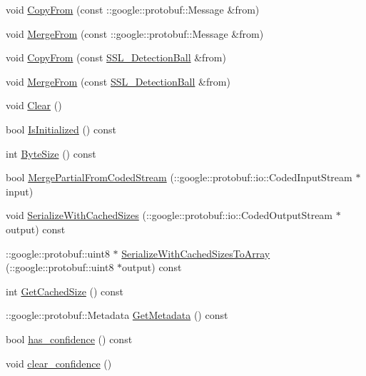 \begin{DoxyCompactItemize}
\item 
void \hyperlink{class_s_s_l___detection_ball_a55771fde572c265105d1bc3a7194a23b}{Copy\-From} (const \-::google\-::protobuf\-::\-Message \&from)
\item 
void \hyperlink{class_s_s_l___detection_ball_a66d69ce3f2f6871e52a61d64d3059867}{Merge\-From} (const \-::google\-::protobuf\-::\-Message \&from)
\item 
void \hyperlink{class_s_s_l___detection_ball_a94709b3e2b567fef87974d769b4bcfbf}{Copy\-From} (const \hyperlink{class_s_s_l___detection_ball}{S\-S\-L\-\_\-\-Detection\-Ball} \&from)
\item 
void \hyperlink{class_s_s_l___detection_ball_acff44da2b0b08d44c6aaf62079c52e38}{Merge\-From} (const \hyperlink{class_s_s_l___detection_ball}{S\-S\-L\-\_\-\-Detection\-Ball} \&from)
\item 
void \hyperlink{class_s_s_l___detection_ball_a681f818c96bf557392a222296015f09f}{Clear} ()
\item 
bool \hyperlink{class_s_s_l___detection_ball_a156f6ba0f59d688dc9c1206e04011b95}{Is\-Initialized} () const 
\item 
int \hyperlink{class_s_s_l___detection_ball_ae17b89fdfbf9d1fb0db1e3f990625e1d}{Byte\-Size} () const 
\item 
bool \hyperlink{class_s_s_l___detection_ball_abed181a7915fec99436b8649d65b4cdc}{Merge\-Partial\-From\-Coded\-Stream} (\-::google\-::protobuf\-::io\-::\-Coded\-Input\-Stream $\ast$input)
\item 
void \hyperlink{class_s_s_l___detection_ball_ad652651f42df1fa26c419d6829690ee5}{Serialize\-With\-Cached\-Sizes} (\-::google\-::protobuf\-::io\-::\-Coded\-Output\-Stream $\ast$output) const 
\item 
\-::google\-::protobuf\-::uint8 $\ast$ \hyperlink{class_s_s_l___detection_ball_a654f5ed1b81a0e8f0be17659f28f97d9}{Serialize\-With\-Cached\-Sizes\-To\-Array} (\-::google\-::protobuf\-::uint8 $\ast$output) const 
\item 
int \hyperlink{class_s_s_l___detection_ball_a19da06eb034ab0f494c4edc3a4c23875}{Get\-Cached\-Size} () const 
\item 
\-::google\-::protobuf\-::\-Metadata \hyperlink{class_s_s_l___detection_ball_a1f3d482609241b7a99f114cf526ee0c3}{Get\-Metadata} () const 
\item 
bool \hyperlink{class_s_s_l___detection_ball_a86b98b2d95d67ff58759e4e02ce3ed57}{has\-\_\-confidence} () const 
\item 
void \hyperlink{class_s_s_l___detection_ball_af35d48ca228c0b2a89b65a1dcfd818fa}{clear\-\_\-confidence} ()

\end{DoxyCompactItemize}
